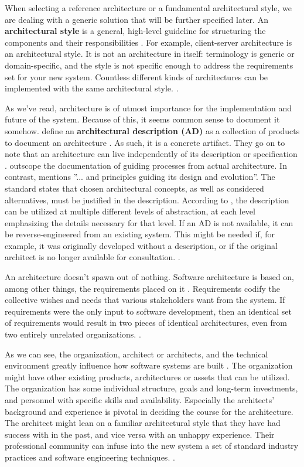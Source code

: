 \documentclass[utf8,english]{gradu3}
\begin{document}
When selecting a reference architecture or a fundamental architectural style, we
are dealing with a generic solution that will be further specified later. An
\textbf{architectural style} is a general, high-level guideline for structuring
the components and their responsibilities \parencite[24]{Bass1998}. For example,
client-server architecture is an architectural style. It is not an architecture
in itself: terminology is generic or domain-specific, and the style is not
specific enough to address the requirements set for your new system. Countless
different kinds of architectures can be implemented with the same architectural
style. \parencite[24]{Bass1998}.

As we've read, architecture is of utmost importance for the implementation and
future of the system. Because of this, it seems common sense to document it
somehow. \textcite[24]{Bass1998} define an \textbf{architectural description
  (AD)} as a collection of products to document an architecture
\parencite[3]{IEEE42010}. As such, it is a concrete artifact. They go on to note
that an architecture can live independently of its description or specification
\parencite[24]{Bass1998}. \textcite[27]{Bass1998} outscope the documentation of
guiding processes from actual architecture. In contrast,
\textcite[3]{IEEE42010} mentions ''... and principles guiding its design and
evolution''. The standard states that chosen architectural concepts, as well as
considered alternatives, must be justified in the description. According to
\textcite[67]{IEEE12207}, the description can be utilized at multiple different
levels of abstraction, at each level emphasizing the details necessary for that
level. If an AD is not available, it can be reverse-engineered from an existing
system. This might be needed if, for example, it was originally developed
without a description, or if the original architect is no longer available for
consultation. \parencite[7]{IEEE42010}.

An architecture doesn't spawn out of nothing. Software architecture is based on,
among other things, the requirements placed on it \parencite{Bass1998}.
Requirements codify the collective wishes and needs that various stakeholders
want from the system. If requirements were the only input to software
development, then an identical set of requirements would result in two pieces of
identical architectures, even from two entirely unrelated organizations.
\parencite[5-9]{Bass1998}.

As we can see, the organization, architect or architects, and the technical
environment greatly influence how software systems are built
\parencite{Bass1998}. The organization might have other existing products,
architectures or assets that can be utilized. The organization has some
individual structure, goals and long-term investments, and personnel with
specific skills and availability. Especially the architects' background and
experience is pivotal in deciding the course for the architecture. The architect
might lean on a familiar architectural style that they have had success with in
the past, and vice versa with an unhappy experience. Their professional
community can infuse into the new system a set of standard industry practices
and software engineering techniques. \parencite[5-9]{Bass1998}.
\end{document}

